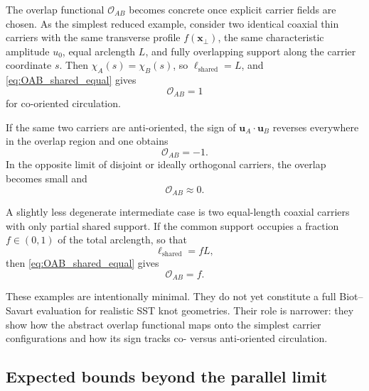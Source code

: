 \documentclass[11pt]{article}
\begin{document}
            The overlap functional \(\mathcal{O}_{AB}\) becomes concrete once explicit carrier fields are chosen. As the simplest reduced example, consider two identical coaxial thin carriers with the same transverse profile \(f(\mathbf{x}_\perp)\), the same characteristic amplitude \(u_0\), equal arclength \(L\), and fully overlapping support along the carrier coordinate \(s\). Then \(\chi_A(s)=\chi_B(s)\), so \(\ell_{\mathrm{shared}}=L\), and \cref{eq:OAB_shared_equal} gives
            \begin{equation}
                \mathcal{O}_{AB}=1
            \end{equation}
            for co-oriented circulation.

            If the same two carriers are anti-oriented, the sign of \(\mathbf{u}_A\cdot\mathbf{u}_B\) reverses everywhere in the overlap region and one obtains
            \begin{equation}
                \mathcal{O}_{AB}=-1.
            \end{equation}
            In the opposite limit of disjoint or ideally orthogonal carriers, the overlap becomes small and
            \begin{equation}
                \mathcal{O}_{AB}\approx 0.
            \end{equation}

            A slightly less degenerate intermediate case is two equal-length coaxial carriers with only partial shared support. If the common support occupies a fraction \(f\in(0,1)\) of the total arclength, so that
            \[
                \ell_{\mathrm{shared}}=fL,
            \]
            then \cref{eq:OAB_shared_equal} gives
            \begin{equation}
                \mathcal{O}_{AB}=f.
            \end{equation}

            These examples are intentionally minimal. They do not yet constitute a full Biot--Savart evaluation for realistic SST knot geometries. Their role is narrower: they show how the abstract overlap functional maps onto the simplest carrier configurations and how its sign tracks co- versus anti-oriented circulation.

        \subsection{Expected bounds beyond the parallel limit}
            
\end{document}
